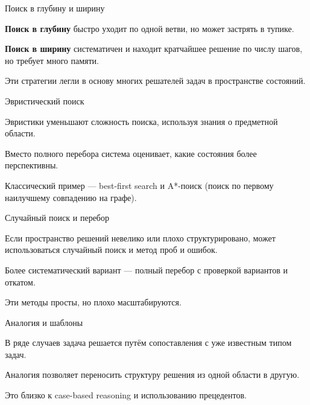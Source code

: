 \begin{frame}{Поиск в глубину и ширину}
	\topline
	\justifying
	
	\begin{textitemize}
		\item \textbf{Поиск в глубину} быстро уходит по одной ветви, но может застрять в тупике.
		\item \textbf{Поиск в ширину} систематичен и находит кратчайшее решение по числу шагов, но требует много памяти.
		\item Эти стратегии легли в основу многих решателей задач в пространстве состояний.
	\end{textitemize}
\end{frame}

\begin{frame}{Эвристический поиск}
	\topline
	\justifying
	
	\begin{textitemize}
		\item Эвристики уменьшают сложность поиска, используя знания о предметной области.
		\item Вместо полного перебора система оценивает, какие состояния более перспективны.
		\item Классический пример --- best-first search и A*-поиск (поиск по первому наилучшему совпадению на графе).
	\end{textitemize}
\end{frame}

\begin{frame}{Случайный поиск и перебор}
	\topline
	\justifying
	
	\begin{textitemize}
		\item Если пространство решений невелико или плохо структурировано, может использоваться случайный поиск и метод проб и ошибок.
		\item Более систематический вариант --- полный перебор с проверкой вариантов и откатом.
		\item Эти методы просты, но плохо масштабируются.
	\end{textitemize}
\end{frame}

\begin{frame}{Аналогия и шаблоны}
	\topline
	\justifying
	
	\begin{textitemize}
		\item В ряде случаев задача решается путём сопоставления с уже известным типом задач.
		\item Аналогия позволяет переносить структуру решения из одной области в другую.
		\item Это близко к case-based reasoning и использованию прецедентов.
	\end{textitemize}
\end{frame}

